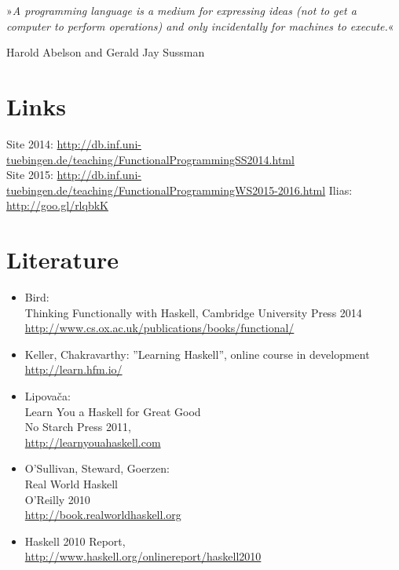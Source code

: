 \documentclass[12pt,a4paper]{article}
\begin{document}
\tableofcontents


\newpage

\vspace*{\fill}
»\textit{A programming language is a medium for expressing ideas (not to get a computer to perform operations) and only incidentally for machines to execute.}«\\
\begin{flushright}
    Harold Abelson and Gerald Jay Sussman
\end{flushright}
\vspace*{\fill}

\newpage


\section*{Links}

Site 2014: \url{http://db.inf.uni-tuebingen.de/teaching/FunctionalProgrammingSS2014.html}\\
Site 2015: \url{http://db.inf.uni-tuebingen.de/teaching/FunctionalProgrammingWS2015-2016.html}
Ilias: \url{http://goo.gl/rlqbkK}

\section*{Literature}

\begin{itemize}
	\item Bird:\\Thinking Functionally with Haskell, Cambridge University Press 2014\\ \url{http://www.cs.ox.ac.uk/publications/books/functional/}
	\item Keller, Chakravarthy: ''Learning Haskell'', online course in development\\ \url{http://learn.hfm.io/}
    \item Lipovača: \\ Learn You a Haskell for Great Good \\ No Starch Press 2011, \\ \url{http://learnyouahaskell.com}
    \item O'Sullivan, Steward, Goerzen: \\ Real World Haskell \\ O'Reilly 2010 \\ \url{http://book.realworldhaskell.org}
    \item Haskell 2010 Report, \\ \url{http://www.haskell.org/onlinereport/haskell2010}
\end{itemize}
\end{document}
